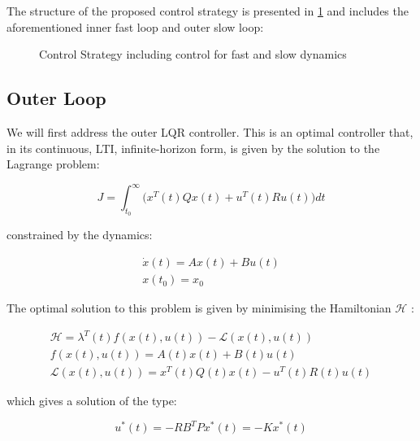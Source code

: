 The structure of the proposed control strategy is presented in \cref{fig:tikzControlStrat} and includes the aforementioned inner fast loop and outer slow loop:  

\begin{figure}[h!]
	\centering
	\resizebox{\columnwidth}{!}{
	}
	\caption{Control Strategy including control for fast and slow dynamics}
	\label{fig:tikzControlStrat}
\end{figure}

\subsection{Outer Loop}\label{subsec:OuterLoop}

We will first address the outer LQR controller. This is an optimal controller that, in its continuous, LTI, infinite-horizon form, is given by the solution to the Lagrange problem:

\begin{equation}\label{eq:LagrangeProblem}
		J = \int_{t_0}^{\infty} \big(x^T(t)Qx(t) + u^T(t)Ru(t)\big)dt
\end{equation} 

constrained by the dynamics:

\begin{equation}\label{eq:LQRDynamicsConstraint}
	\begin{gathered}
		\dot{x}(t) = Ax(t) + Bu(t) \\
		x(t_0) = x_0
	\end{gathered} 
\end{equation}

The optimal solution to this problem is given by minimising the Hamiltonian $\mathcal{H}$ \cite{Liberzon2012}:

\begin{equation}\label{eq:Hamiltonian}
	\begin{gathered}
			\mathcal{H} = \lambda^T(t) f(x(t),u(t)) - \mathcal{L}(x(t),u(t)) \\
			f(x(t),u(t)) = A(t)x(t) + B(t)u(t) \\
			\mathcal{L}(x(t),u(t)) =  x^T(t)Q(t)x(t) - u^T(t)R(t)u(t)
	\end{gathered}
\end{equation}

which gives a solution of the type:

\begin{equation}\label{eq:LQRSolution}
	u^*(t) = -RB^TPx^*(t) = -Kx^*(t)
\end{equation}

